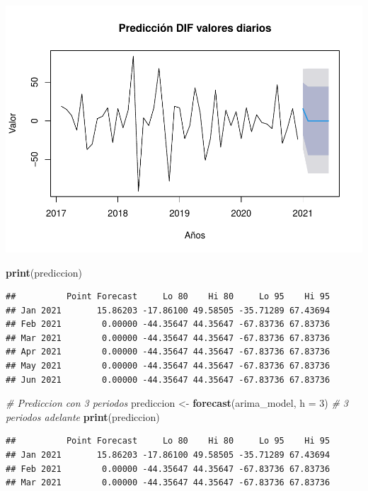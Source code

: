 \documentclass[
]{book}
\newenvironment{Shaded}{\begin{snugshade}}{\end{snugshade}}
\newcommand{\AttributeTok}[1]{\textcolor[rgb]{0.13,0.29,0.53}{#1}}
\newcommand{\CommentTok}[1]{\textcolor[rgb]{0.56,0.35,0.01}{\textit{#1}}}
\newcommand{\DecValTok}[1]{\textcolor[rgb]{0.00,0.00,0.81}{#1}}
\newcommand{\FunctionTok}[1]{\textcolor[rgb]{0.13,0.29,0.53}{\textbf{#1}}}
\newcommand{\NormalTok}[1]{#1}
\newcommand{\OtherTok}[1]{\textcolor[rgb]{0.56,0.35,0.01}{#1}}
\begin{document}
\includegraphics{_main_files/figure-latex/unnamed-chunk-20-1.pdf}

\begin{Shaded}
\begin{Highlighting}[]
\FunctionTok{print}\NormalTok{(prediccion)}
\end{Highlighting}
\end{Shaded}

\begin{verbatim}
##          Point Forecast     Lo 80    Hi 80     Lo 95    Hi 95
## Jan 2021       15.86203 -17.86100 49.58505 -35.71289 67.43694
## Feb 2021        0.00000 -44.35647 44.35647 -67.83736 67.83736
## Mar 2021        0.00000 -44.35647 44.35647 -67.83736 67.83736
## Apr 2021        0.00000 -44.35647 44.35647 -67.83736 67.83736
## May 2021        0.00000 -44.35647 44.35647 -67.83736 67.83736
## Jun 2021        0.00000 -44.35647 44.35647 -67.83736 67.83736
\end{verbatim}

\begin{Shaded}
\begin{Highlighting}[]
\CommentTok{\# Prediccion con 3 periodos}
\NormalTok{prediccion }\OtherTok{\textless{}{-}} \FunctionTok{forecast}\NormalTok{(arima\_model, }\AttributeTok{h =} \DecValTok{3}\NormalTok{) }\CommentTok{\# 3 periodos adelante}
\FunctionTok{print}\NormalTok{(prediccion)}
\end{Highlighting}
\end{Shaded}

\begin{verbatim}
##          Point Forecast     Lo 80    Hi 80     Lo 95    Hi 95
## Jan 2021       15.86203 -17.86100 49.58505 -35.71289 67.43694
## Feb 2021        0.00000 -44.35647 44.35647 -67.83736 67.83736
## Mar 2021        0.00000 -44.35647 44.35647 -67.83736 67.83736
\end{verbatim}
\end{document}
